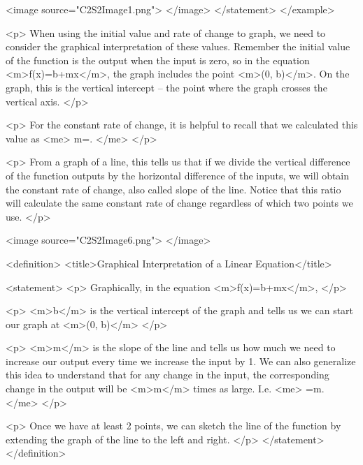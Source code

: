                 <image source="C2S2Image1.png">
                </image>
            </statement>
        </example>

        <p>
            When using the initial value and rate of change to graph, we need to consider the graphical interpretation of these values.
            Remember the initial value of the function is the output when the input is zero, so in the equation <m>f(x)=b+mx</m>, the graph includes the point <m>(0, b)</m>.
            On the graph, this is the vertical intercept – the point where the graph crosses the vertical axis.
        </p>

        <p>
            For the constant rate of change, it is helpful to recall that we calculated this value as
            <me>
                m=.
            </me>
        </p>

        <p>
            From a graph of a line, this tells us that if we divide the vertical difference of the function outputs by the horizontal difference of the inputs, we will obtain the constant rate of change, also called slope of the line.
            Notice that this ratio will calculate the same constant rate of change regardless of which two points we use.
        </p>

        <image source="C2S2Image6.png">
        </image>

        <definition>
            <title>Graphical Interpretation of a Linear Equation</title>

            <statement>
                <p>
                    Graphically, in the equation <m>f(x)=b+mx</m>,
                </p>

                <p>
                    <m>b</m> is the vertical intercept of the graph and tells us we can start our graph at <m>(0, b)</m>
                </p>

                <p>
                    <m>m</m> is the slope of the line and tells us how much we need to increase our output every time we increase the input by 1. We can also generalize this idea to understand that for any change in the input, the corresponding change in the output will be <m>m</m> times as large. I.e.
                    <me>
                        =m\times {}.
                    </me>
                </p>

                <p>
                    Once we have at least 2 points, we can sketch the line of the function by extending the graph of the line to the left and right.
                </p>
            </statement>
        </definition>

